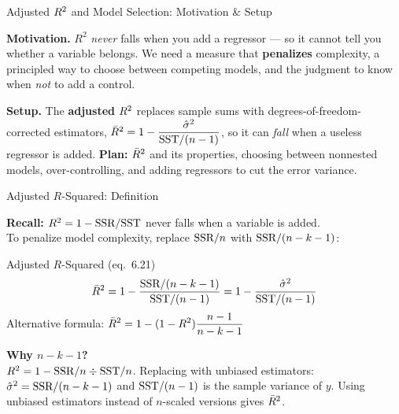 \documentclass[aspectratio=169, 12pt]{beamer}
\begin{document}
\begin{frame}{Adjusted $R^2$ and Model Selection: Motivation \& Setup}

  \begin{highlightbox}
    \textbf{Motivation.} $R^2$ \emph{never} falls when you add a regressor --- so it
    cannot tell you whether a variable belongs. We need a measure that
    \textbf{penalizes} complexity, a principled way to choose between competing models,
    and the judgment to know when \emph{not} to add a control.
  \end{highlightbox}

  \begin{keybox}
    \textbf{Setup.} The \textbf{adjusted} $R^2$ replaces sample sums with
    degrees-of-freedom-corrected estimators,
    $\bar{R}^2 = 1 - \dfrac{\hat\sigma^2}{\text{SST}/(n-1)}$, so it can \emph{fall} when a
    useless regressor is added. \textbf{Plan:} $\bar{R}^2$ and its properties, choosing
    between nonnested models, over-controlling, and adding regressors to cut the error
    variance.
  \end{keybox}

\end{frame}

\begin{frame}[shrink=8]{Adjusted $R$-Squared: Definition}

  \textbf{Recall:} $R^2 = 1 - \text{SSR}/\text{SST}$ never falls when a variable is added. \\
  To penalize model complexity, replace $\text{SSR}/n$ with $\text{SSR}/(n-k-1)$:

  \medskip

  \begin{definitionbox}{Adjusted $R$-Squared (eq.\ 6.21)}
    \[
      \bar{R}^2 = 1 - \frac{\text{SSR}/(n-k-1)}{\text{SST}/(n-1)}
            = 1 - \frac{\hat\sigma^2}{\text{SST}/(n-1)}
    \]
    Alternative formula: $\displaystyle\bar{R}^2 = 1 - (1 - R^2)\frac{n-1}{n-k-1}$
  \end{definitionbox}

  \medskip

  \begin{keybox}
    \textbf{Why $n-k-1$?} \\[4pt]
    $R^2 = 1 - \text{SSR}/n \div \text{SST}/n$. Replacing with unbiased estimators:
    $\hat\sigma^2 = \text{SSR}/(n-k-1)$ and $\text{SST}/(n-1)$ is the sample variance of $y$.
    Using unbiased estimators instead of $n$-scaled versions gives $\bar{R}^2$.
  \end{keybox}

\end{frame}
\end{document}
